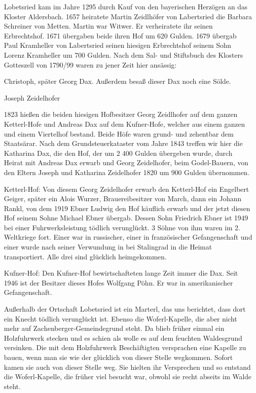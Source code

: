 \documentclass[12pt,a4pager]{book}
\begin{document}
Lobetsried kam im Jahre 1295 durch Kauf von den bayerischen Herzögen an das
Kloster Aldersbach. 1657 heiratete Martin Zeidlhöfer von Labertsried die Barbara
Schreiner von Metten. Martin war Witwer. Er verheiratete ihr seinen
Erbrechtshof. 1671 übergaben beide ihren Hof um 620 Gulden. 1679 übergab Paul
Kramheller von Labertsried seinen hiesigen Erbrechtshof seinem Sohn Lorenz
Kramheller um 700 Gulden. Nach dem Sal- und Stiftsbuch des Klosters Gotteszell
von 1790/99 waren zu jener Zeit hier ansässig:

Christoph, später Georg Dax. Außerdem besaß dieser Dax noch eine Sölde.

Joseph Zeidelhofer

1823 hießen die beiden hiesigen Hofbesitzer Georg Zeidlhofer auf dem ganzen
Ketterl-Hofe und Andreas Dax auf dem Kufner-Hofe, welcher aus einem ganzen und
einem Viertelhof bestand. Beide Höfe waren grund- und zehentbar dem Staatsärar.
Nach dem Grundsteuerkataster vom Jahre 1843 treffen wir hier die Katharina Dax,
die den Hof, der um 2 400 Gulden übergeben wurde, durch Heirat mit Andreas Dax
erwarb und Georg Zeidelhofer, beim Godel-Bauern, von den Eltern Joseph und
Katharina Zeidelhofer 1820 um 900 Gulden übernommen.

Ketterl-Hof: Von diesem Georg Zeidelhofer erwarb den Ketterl-Hof ein Engelbert
Geiger, später ein Alois Wurzer, Brauereibesitzer von March, dann ein Johann
Rankl, von dem 1919 Ebner Ludwig den Hof käuflich erwarb und der jetzt diesen
Hof seinem Sohne Michael Ebner übergab. Dessen Sohn Friedrich Ebner ist 1949 bei
einer Fuhrwerksleistung tödlich verunglückt. 3 Söhne von ihm waren im 2.
Weltkriege fort. Einer war in russischer, einer in französischer Gefangenschaft
und einer wurde nach seiner Verwundung in bei Stalingrad in die Heimat
transportiert. Alle drei sind glücklich heimgekommen.

Kufner-Hof: Den Kufner-Hof bewirtschafteten lange Zeit immer die Dax. Seit 1946
ist der Besitzer dieses Hofes Wolfgang Pöhn. Er war in amerikanischer
Gefangenschaft.

Außerhalb der Ortschaft Lobetsried ist ein Marterl, das uns berichtet, dass dort
ein Knecht tödlich verunglückt ist. Ebenso die Woferl-Kapelle, die aber nicht
mehr auf Zachenberger-Gemeindegrund steht. Da blieb früher einmal ein
Holzfuhrwerk stecken und es schien als wolle es auf dem feuchten Waldesgrund
versinken. Die mit dem Holzfuhrwerk Beschäftigten versprachen eine Kapelle zu
bauen, wenn man sie wie der glücklich von dieser Stelle wegkommen. Sofort kamen
sie auch von dieser Stelle weg. Sie hielten ihr Versprechen und so entstand die
Woferl-Kapelle, die früher viel besucht war, obwohl sie recht abseits im Walde
steht.
\end{document}
